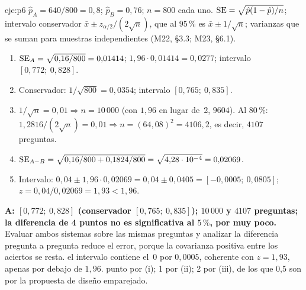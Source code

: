 \begin{solucion}{eje:p6}
\datos $\hat p_A=640/800=0{,}8$; $\hat p_B=0{,}76$; $n=800$ cada uno.
\planteamiento $\operatorname{SE}=\sqrt{\hat p(1-\hat p)/n}$; intervalo conservador $\bar x\pm z_{\alpha/2}/(2\sqrt n)$, que al $95\,\%$ es $\bar x\pm 1/\sqrt n$; varianzas que se suman para muestras independientes (M22, §3.3; M23, §6.1).
\pasos
\begin{enumerate}[label=\arabic*.]
  \item $\operatorname{SE}_A=\sqrt{0{,}16/800}=0{,}01414$; $1{,}96\cdot 0{,}01414=0{,}0277$; intervalo $[0{,}772;\ 0{,}828]$.
  \item Conservador: $1/\sqrt{800}=0{,}0354$; intervalo $[0{,}765;\ 0{,}835]$.
  \item $1/\sqrt n=0{,}01\Rightarrow n=10\,000$ (con $1{,}96$ en lugar de~2, $9604$). Al $80\,\%$: $1{,}2816/(2\sqrt n)=0{,}01\Rightarrow n=(64{,}08)^{2}=4106{,}2$, es decir, $4107$ preguntas.
  \item $\operatorname{SE}_{A-B}=\sqrt{0{,}16/800+0{,}1824/800}=\sqrt{4{,}28\cdot 10^{-4}}=0{,}02069$.
  \item Intervalo: $0{,}04\pm 1{,}96\cdot 0{,}02069=0{,}04\pm 0{,}0405=[-0{,}0005;\ 0{,}0805]$; $z=0{,}04/0{,}02069=1{,}93<1{,}96$.
\end{enumerate}
\resultado \textbf{A: $[0{,}772;\ 0{,}828]$ (conservador $[0{,}765;\ 0{,}835]$); $10\,000$ y $4107$ preguntas; la diferencia de 4 puntos no es significativa al $5\,\%$, por muy poco.} Evaluar ambos sistemas sobre las mismas preguntas y analizar la diferencia pregunta a pregunta reduce el error, porque la covarianza positiva entre los aciertos se resta.
\comprobacion el intervalo contiene el~0 por $0{,}0005$, coherente con $z=1{,}93$, apenas por debajo de $1{,}96$.
 punto por (i); 1 por (ii); 2 por (iii), de los que 0,5 son por la propuesta de diseño emparejado.
\end{solucion}

